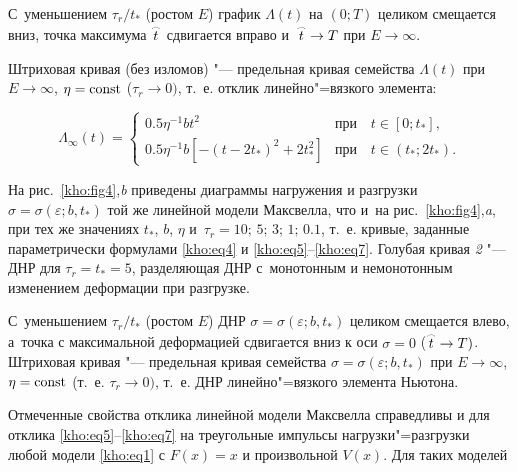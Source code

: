 С~уменьшением $\tau_r/t_\ast$ (ростом $E$) график $\Lambda(t)$ на $(0;T)$ целиком смещается вниз, точка максимума $\mathord{\buildrel{\lower3pt\hbox{$\scriptscriptstyle\frown$}}\over {t}}$ сдвигается вправо и~$\mathord{\buildrel{\lower3pt\hbox{$\scriptscriptstyle\frown$}}\over{t}}\to T$ при $E\to\infty$. 

Штриховая кривая (без изломов) "--- предельная кривая семейства $\Lambda(t)$ при $E\to\infty$, $\eta={\rm const}$ ($\tau_r\to0)$, т.~е. отклик линейно"=вязкого элемента: 

\[

\Lambda_{\infty}(t)=\left\{

\begin{array}{cl}

0.5\eta^{-1}bt^2 &\text{при~~ } t\in[0;t_\ast],

\\

0.5\eta^{-1}b[-(t-2t_\ast)^2+2t_\ast^2] &\text{при~~ } t\in(t_\ast;2t_\ast).

\end{array}

\right.

\]





На рис.~\ref{kho:fig4},{\sl b} приведены диаграммы нагружения и разгрузки $\sigma=\sigma(\varepsilon;b,t_\ast)$ той же линейной модели Максвелла, что и~на рис.~\ref{kho:fig4},{\sl a}, при тех же значениях $t_\ast$, $b$, $\eta$ и~$\tau_r=10;\,5;\,3;\,1;\,0.1$, т.~е. кривые, заданные параметрически формулами \eqref{kho:eq4} и \eqref{kho:eq5}--\eqref{kho:eq7}. Голубая кривая {\sl 2} "--- ДНР для $\tau_r=t_\ast=5$, разделяющая ДНР с~монотонным и немонотонным изменением деформации при разгрузке. 

С~уменьшением $\tau_r/t_\ast$ (ростом $E$) ДНР $\sigma=\sigma(\varepsilon;b,t_\ast)$ целиком смещается влево, а~точка с максимальной деформацией сдвигается вниз к оси $\sigma=0$ ($\mathord{\buildrel{\lower3pt\hbox{$\scriptscriptstyle\frown$}}\over{t}}\to T)$. Штриховая кривая "--- предельная кривая семейства $\sigma=\sigma(\varepsilon;b,t_\ast)$ при $E\to\infty$, $\eta={\rm const}$ (т.~е. $\tau_r\to0)$, т.~е. ДНР линейно"=вязкого элемента Ньютона. 



Отмеченные свойства отклика линейной модели Максвелла справедливы и для отклика \eqref{kho:eq5}--\eqref{kho:eq7} на треугольные импульсы нагрузки"=разгрузки любой модели \eqref{kho:eq1} с $F(x)=x$ и произвольной $V(x)$. Для таких моделей 

